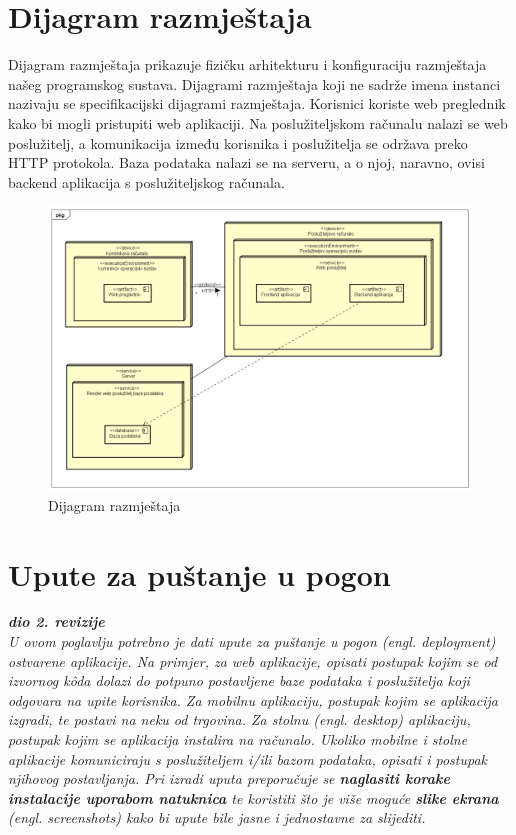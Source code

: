 			\eject 
		
		
		\section{Dijagram razmještaja}
			
		\noindent Dijagram razmještaja prikazuje fizičku arhitekturu i konfiguraciju razmještaja našeg programskog sustava. Dijagrami razmještaja koji ne sadrže imena instanci nazivaju se specifikacijski dijagrami razmještaja. Korisnici koriste web preglednik kako bi mogli pristupiti web aplikaciji. Na poslužiteljskom računalu nalazi se web poslužitelj, a komunikacija između korisnika i poslužitelja se održava preko HTTP protokola. Baza podataka nalazi se na serveru, a o njoj, naravno, ovisi backend aplikacija s poslužiteljskog računala.
			
			\begin{figure}[H]
				\centering
				\includegraphics[width=1\textwidth]{slike/dijagrami/Dijagram razmjestaja.png}
				\caption{Dijagram razmještaja}
				\label{fig:enter-label}
			\end{figure}	

			\eject 
		
		\section{Upute za puštanje u pogon}
		
			\textbf{\textit{dio 2. revizije}}\\
		
			 \textit{U ovom poglavlju potrebno je dati upute za puštanje u pogon (engl. deployment) ostvarene aplikacije. Na primjer, za web aplikacije, opisati postupak kojim se od izvornog kôda dolazi do potpuno postavljene baze podataka i poslužitelja koji odgovara na upite korisnika. Za mobilnu aplikaciju, postupak kojim se aplikacija izgradi, te postavi na neku od trgovina. Za stolnu (engl. desktop) aplikaciju, postupak kojim se aplikacija instalira na računalo. Ukoliko mobilne i stolne aplikacije komuniciraju s poslužiteljem i/ili bazom podataka, opisati i postupak njihovog postavljanja. Pri izradi uputa preporučuje se \textbf{naglasiti korake instalacije uporabom natuknica} te koristiti što je više moguće \textbf{slike ekrana} (engl. screenshots) kako bi upute bile jasne i jednostavne za slijediti.}
			
